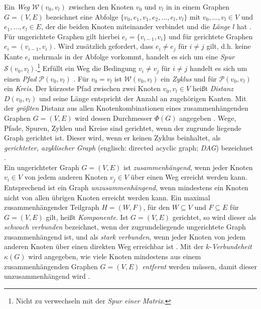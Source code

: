 \documentclass[12pt, a4paper]{report}
\begin{document}
Ein \textit{Weg} $\mathcal{W}(v_0,v_l)$ zwischen den Knoten $v_0$ und $v_l$ in in einem Graphen $G=(V,E)$ bezeichnet eine Abfolge $\{v_0, e_1, v_1, e_2, \dots,e_l,v_l \}$ mit $v_0, \dots, v_l \in V$ und $e_1,\dots,e_l \in E$, der die beiden Knoten miteinander verbindet und die \textit{Länge} $l$ hat \cite{diestel2006graph}. Für ungerichtete Graphen gilt hierbei $e_i=\{v_{i-1}, v_i\}$ und für gerichtete Graphen $e_i=(v_{i-1}, v_i)$. Wird zusätzlich gefordert, dass $e_i \neq e_j$ für $i \neq j$ gilt, d.h. keine Kante $e_i$ mehrmals in der Abfolge vorkommt, handelt es sich um eine \textit{Spur} $\mathcal{S}(v_0,v_l)$.\footnote{Nicht zu verwechseln mit der \textit{Spur einer Matrix}.} Erfüllt ein Weg die Bedingung $v_i \neq v_j$ für $i \neq j$ handelt es sich um einen \textit{Pfad} $\mathcal{P}(v_0,v_l)$  \cite{brandes2005graphfunda}. Für $v_0 = v_l$ ist $\mathcal{W}(v_0,v_l)$ ein \textit{Zyklus} und für $\mathcal{P}(v_0,v_l)$ ein \textit{Kreis}. Der kürzeste Pfad zwischen zwei Knoten $v_0,v_l \in V$ heißt \textit{Distanz} $D(v_0,v_l)$ und seine Länge entspricht der Anzahl an zugehörigen Kanten. Mit der \textit{größten} Distanz aus allen Knotenkombinationen eines zusammenhängenden Graphen $G=(V,E)$ wird dessen Durchmesser $\Phi(G)$ angegeben \cite{diestel2006graph}. Wege, Pfade, Spuren, Zyklen und Kreise sind gerichtet, wenn der zugrunde liegende Graph gerichtet ist. Dieser wird, wenn er keinen Zyklus beinhaltet, als \textit{gerichteter, azyklischer Graph}  (englisch: directed acyclic graph; \textit{DAG}) bezeichnet \cite{kolaczyk2009statistical}.\\

Ein ungerichteter Graph $G=(V,E)$ ist \textit{zusammenhängend}, wenn jeder Knoten $v_i \in V$ von jedem anderen Knoten $v_j \in V$ über einen Weg erreicht werden kann. Entsprechend ist ein Graph \textit{unzusammenhängend}, wenn mindestens ein Knoten nicht von allen übrigen Knoten erreicht werden kann. Ein maximal zusammenhängender Teilgraph $H=(W,F)$, für den $W \subseteq V$ und $F \subseteq E$ für $G=(V,E)$ gilt, heißt \textit{Komponente}. Ist $G=(V,E)$ gerichtet, so wird dieser als \textit{schwach verbunden} bezeichnet, wenn der zugrundeliegende ungerichtete Graph zusammenhängend ist, und als \textit{stark verbunden}, wenn jeder Knoten von jedem anderen Knoten über einen direkten Weg erreichbar ist \cite{brandes2005graphfunda}. Mit der $k$-\textit{Verbundeheit} $\kappa(G)$ wird angegeben, wie viele Knoten mindestens aus einem zusammenhängenden Graphen $G=(V,E)$ \textit{entfernt} werden müssen, damit dieser unzusammenhängend wird \cite{diestel2006graph}.\\
\end{document}
